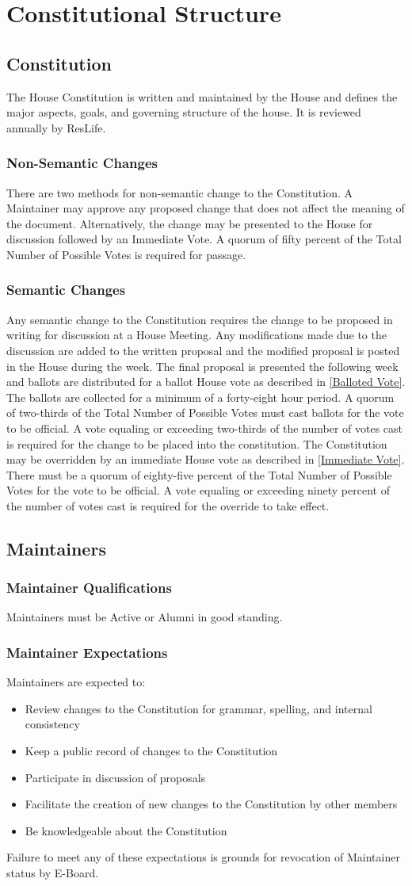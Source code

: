 \documentclass{article}
\newcommand{\article}[1]{\section{#1} \label{#1}}
\newcommand{\asection}[1]{\subsection{#1} \label{#1}}
\newcommand{\asubsection}[1]{\subsubsection{#1} \label{#1}}
\begin{document}
\article{Constitutional Structure}

\asection{Constitution}
The House Constitution is written and maintained by the House and defines the major aspects, goals, and governing structure of the house.
It is reviewed annually by ResLife.

\asubsection{Non-Semantic Changes}
There are two methods for non-semantic change to the Constitution.
A Maintainer may approve any proposed change that does not affect the meaning of the document.
Alternatively, the change may be presented to the House for discussion followed by an Immediate Vote.
A quorum of fifty percent of the Total Number of Possible Votes is required for passage.

\asubsection{Semantic Changes}
Any semantic change to the Constitution requires the change to be proposed in writing for discussion at a House Meeting.
Any modifications made due to the discussion are added to the written proposal and the modified proposal is posted in the House during the week.
The final proposal is presented the following week and ballots are distributed for a ballot House vote as described in \ref{Balloted Vote}.
The ballots are collected for a minimum of a forty-eight hour period.
A quorum of two-thirds of the Total Number of Possible Votes must cast ballots for the vote to be official.
A vote equaling or exceeding two-thirds of the number of votes cast is required for the change to be placed into the constitution.
The Constitution may be overridden by an immediate House vote as described in \ref{Immediate Vote}.
There must be a quorum of eighty-five percent of the Total Number of Possible Votes for the vote to be official.
A vote equaling or exceeding ninety percent of the number of votes cast is required for the override to take effect.

\asection{Maintainers}

\asubsection{Maintainer Qualifications}
Maintainers must be Active or Alumni in good standing.

\asubsection{Maintainer Expectations}
Maintainers are expected to:
\begin{itemize}
	\item Review changes to the Constitution for grammar, spelling, and internal consistency
	\item Keep a public record of changes to the Constitution
	\item Participate in discussion of proposals
	\item Facilitate the creation of new changes to the Constitution by other members
	\item Be knowledgeable about the Constitution
\end{itemize}
Failure to meet any of these expectations is grounds for revocation of Maintainer status by E-Board.
\end{document}
